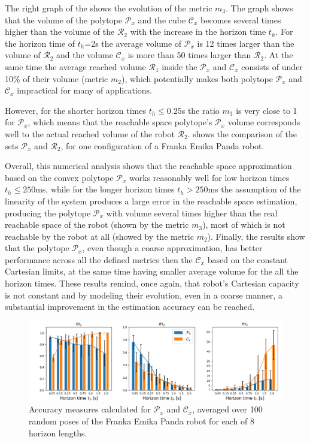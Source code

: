 The right graph of the  shows the evolution of the metric $m_3$. The graph shows that the volume of the polytope $\mathcal{P}_x$ and the cube $\mathcal{C}_x$ becomes several times higher than the volume of the $\mathcal{R}_2$ with the increase in the horizon time $t_h$. For the horizon time of $t_h$=2s the average volume of $\mathcal{P}_x$ is 12 times larger than the volume of $\mathcal{R}_2$ and the volume $\mathcal{C}_x$ is more than 50 times larger than $\mathcal{R}_2$. At the same time the average reached volume $\mathcal{R}_1$ inside the $\mathcal{P}_x$ and $\mathcal{C}_x$ consists of under 10\% of their volume (metric $m_2$), which potentially makes both polytope $\mathcal{P}_x$ and $\mathcal{C}_x$ impractical for many of applications.

However, for the shorter horizon times $t_h\leq0.25$s the ratio $m_3$ is very close to 1 for $\mathcal{P}_x$, which means that the reachable space polytope's $\mathcal{P}_x$ volume corresponds well to the actual reached volume of the robot $\mathcal{R}_2$.   shows the comparison of the sets $\mathcal{P}_x$ and $\mathcal{R}_2$, for one configuration of a Franka Emika Panda robot.



Overall, this numerical analysis shows that the reachable space approximation based on the convex polytope $\mathcal{P}_x$ works reasonably well for low horizon times $t_h\leq250$ms, while for the longer horizon times $t_h>250$ms the assumption of the linearity of the system produces a large error in the reachable space estimation, producing the polytope $\mathcal{P}_x$ with volume several times higher than the real reachable space of the robot (shown by the metric $m_3$), most of which is not reachable by the robot at all (showed by the metric $m_2$). Finally, the results show that the polytope $\mathcal{P}_x$, even though a coarse approximation, has better performance across all the defined metrics then the $\mathcal{C}_x$ based on the constant Cartesian limits, at the same time having smaller average volume for the all the horizon times. These results remind, once again, that robot's Cartesian capacity is not constant and by modeling their evolution, even in a coarse manner, a substantial improvement in the estimation accuracy can be reached.


\begin{figure}[!t]
    \centering
    \includegraphics[width=\textwidth]{Papers/images/metrics_results_double.png}
    \caption{Accuracy measures calculated for $\mathcal{P}_x$ and $\mathcal{C}_x$, averaged over 100 random poses of the Franka Emika Panda robot for each of 8 horizon lengths.}
    \label{fig:accuracy}
    
\end{figure}


